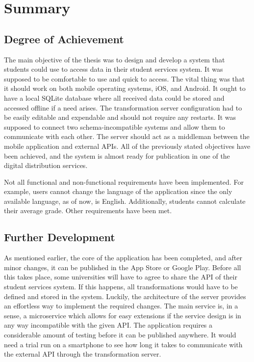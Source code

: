 \chapter{Summary}
\section{Degree of Achievement}
The main objective of the thesis was to design and develop a system that students could use to access data in their student services system. It was supposed to be comfortable to use and quick to access. The vital thing was that it should work on both mobile operating systems, iOS, and Android. It ought to have a local SQLite database where all received data could be stored and accessed offline if a need arises. The transformation server configuration had to be easily editable and expendable and should not require any restarts. It was supposed to connect two schema-incompatible systems and allow them to communicate with each other. The server should act as a middleman between the mobile application and external APIs. All of the previously stated objectives have been achieved, and the system is almost ready for publication in one of the digital distribution services.

Not all functional and non-functional requirements have been implemented. For example, users cannot change the language of the application since the only available language, as of now, is English. Additionally, students cannot calculate their average grade. Other requirements have been met.

\section{Further Development}
As mentioned earlier, the core of the application has been completed, and after minor changes, it can be published in the App Store or Google Play. Before all this takes place, some universities will have to agree to share the API of their student services system. If this happens, all transformations would have to be defined and stored in the system. Luckily, the architecture of the server provides an effortless way to implement the required changes. The main service is, in a sense, a microservice which allows for easy extensions if the service design is in any way incompatible with the given API. The application requires a considerable amount of testing before it can be published anywhere. It would need a trial run on a smartphone to see how long it takes to communicate with the external API through the transformation server.


